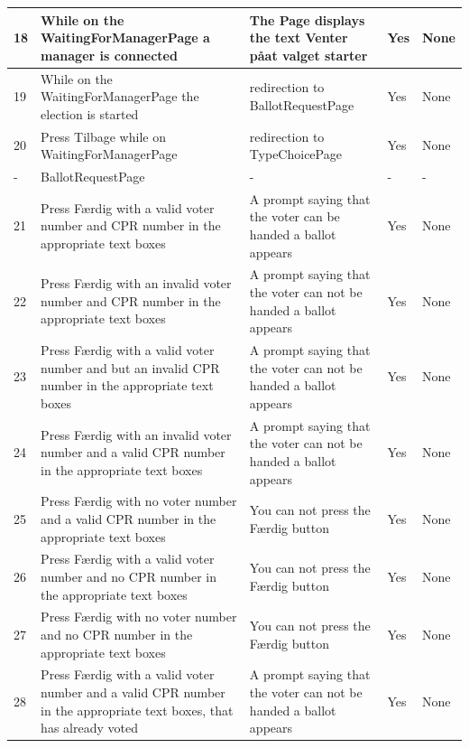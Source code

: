\documentclass[a4paper]{report}
\begin{document}
\begin{longtable}{|p{5mm}|p{}|p{}|p{}|p{}|}
 \\\hline
18 & While on the WaitingForManagerPage a manager is connected & The Page displays the text Venter p\aa  at valget starter & Yes & None 

 \\\hline
19 & While on the WaitingForManagerPage the election is started & redirection to BallotRequestPage & Yes & None 

 \\\hline
20 & Press Tilbage while on WaitingForManagerPage & redirection to TypeChoicePage & Yes & None 

\\\hline
- & BallotRequestPage & - & - & -

 \\\hline
21 & Press F\ae rdig with a valid voter number and CPR number in the appropriate text boxes & A prompt saying that the voter can be handed a ballot appears & Yes & None 

 \\\hline
22 & Press F\ae rdig with an invalid voter number and CPR number in the appropriate text boxes & A prompt saying that the voter can not be handed a ballot appears & Yes & None 

 \\\hline
23 & Press F\ae rdig with a valid voter number and but an invalid CPR number in the appropriate text boxes & A prompt saying that the voter can not be handed a ballot appears & Yes & None 

 \\\hline
24 & Press F\ae rdig with an invalid voter number and a valid CPR number in the appropriate text boxes & A prompt saying that the voter can not be handed a ballot appears & Yes & None 

\\\hline
25 & Press F\ae rdig with no voter number and a valid CPR number in the appropriate text boxes & You can not press the F\ae rdig button & Yes & None 

\\\hline
26 & Press F\ae rdig with a valid voter number and no CPR number in the appropriate text boxes & You can not press the F\ae rdig button & Yes & None 

\\\hline
27 & Press F\ae rdig with no voter number and no CPR number in the appropriate text boxes & You can not press the F\ae rdig button & Yes & None 

\\\hline
28 & Press F\ae rdig with a valid voter number and a valid CPR number in the appropriate text boxes, that has already voted & A prompt saying that the voter can not be handed a ballot appears & Yes & None 


\end{longtable}
\end{document}
